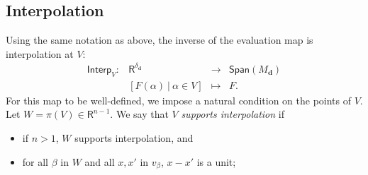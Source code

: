 \documentclass[amsthm]{elsart}
\def\d {\ensuremath{\mathbf{d}}}
\def\rng {\ensuremath{\mathsf{R}}}
\def\Span {\ensuremath{\mathsf{Span}}}
\def\Interp {\ensuremath{\mathsf{Interp}}}
\theoremstyle{plain}
\begin{document}
\subsection{Interpolation}

Using the same notation as above, the inverse of the evaluation map is
interpolation at $V$:
$$\begin{array}{cccc}
\Interp_V:&\rng^{\delta_\d} & \to & \Span(M_\d) \\
& [F(\alpha) \ | \ \alpha \in V] & \mapsto & F.
\end{array}$$
For this map to be well-defined, we impose a natural condition on the
points of $V$. Let $W=\pi(V) \in \rng^{n-1}$. We say that $V$ {\em supports interpolation} if

\smallskip

\begin{itemize}
\item if $n > 1$, $W$ supports interpolation, and

\smallskip

\item for all $\beta$ in $W$ and all $x,x'$ in $v_\beta$, 
  $x-x'$ is a unit;
\end{itemize}
\end{document}

